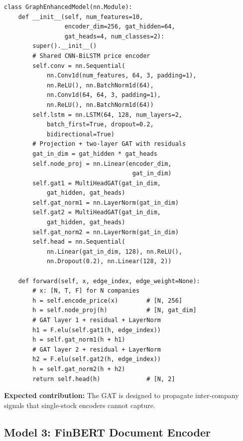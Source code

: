 \documentclass[12pt,a4paper]{article}
\begin{document}
\begin{lstlisting}[caption={Graph-enhanced model with residual GAT (src/models/gat\_model.py)}]
class GraphEnhancedModel(nn.Module):
    def __init__(self, num_features=10,
                 encoder_dim=256, gat_hidden=64,
                 gat_heads=4, num_classes=2):
        super().__init__()
        # Shared CNN-BiLSTM price encoder
        self.conv = nn.Sequential(
            nn.Conv1d(num_features, 64, 3, padding=1),
            nn.ReLU(), nn.BatchNorm1d(64),
            nn.Conv1d(64, 64, 3, padding=1),
            nn.ReLU(), nn.BatchNorm1d(64))
        self.lstm = nn.LSTM(64, 128, num_layers=2,
            batch_first=True, dropout=0.2,
            bidirectional=True)
        # Projection + two-layer GAT with residuals
        gat_in_dim = gat_hidden * gat_heads
        self.node_proj = nn.Linear(encoder_dim,
                                    gat_in_dim)
        self.gat1 = MultiHeadGAT(gat_in_dim,
            gat_hidden, gat_heads)
        self.gat_norm1 = nn.LayerNorm(gat_in_dim)
        self.gat2 = MultiHeadGAT(gat_in_dim,
            gat_hidden, gat_heads)
        self.gat_norm2 = nn.LayerNorm(gat_in_dim)
        self.head = nn.Sequential(
            nn.Linear(gat_in_dim, 128), nn.ReLU(),
            nn.Dropout(0.2), nn.Linear(128, 2))

    def forward(self, x, edge_index, edge_weight=None):
        # x: [N, T, F] for N companies
        h = self.encode_price(x)        # [N, 256]
        h = self.node_proj(h)           # [N, gat_dim]
        # GAT layer 1 + residual + LayerNorm
        h1 = F.elu(self.gat1(h, edge_index))
        h = self.gat_norm1(h + h1)
        # GAT layer 2 + residual + LayerNorm
        h2 = F.elu(self.gat2(h, edge_index))
        h = self.gat_norm2(h + h2)
        return self.head(h)             # [N, 2]
\end{lstlisting}

\textbf{Expected contribution:} The GAT is designed to propagate inter-company signals that single-stock encoders cannot capture.

\subsection{Model 3: FinBERT Document Encoder}
\end{document}
